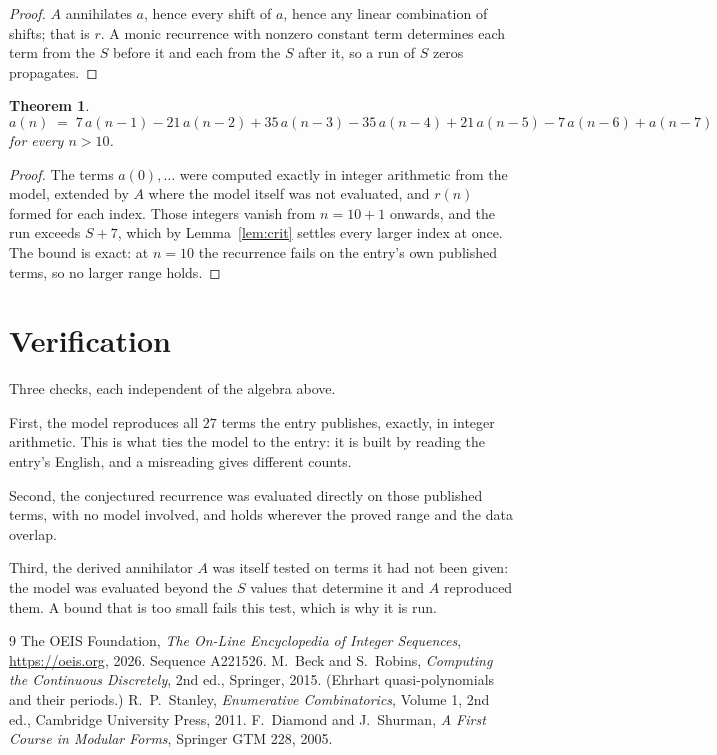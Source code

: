 \documentclass[11pt,a4paper]{article}
\theoremstyle{plain}
\newtheorem{theorem}{Theorem}
\theoremstyle{definition}
\begin{document}
\begin{proof}
$A$ annihilates $a$, hence every shift of $a$, hence any linear combination of shifts; that is
$r$. A monic recurrence with nonzero constant term determines each term from the $S$ before it
and each from the $S$ after it, so a run of $S$ zeros propagates.
\end{proof}

\begin{theorem}
\[
a(n)\;=\;7\,a(n-1) - 21\,a(n-2) + 35\,a(n-3) - 35\,a(n-4) + 21\,a(n-5) - 7\,a(n-6) + a(n-7)
\]
for every $n>10$.
\end{theorem}

\begin{proof}
The terms $a(0),\dots$ were computed exactly in integer arithmetic from the model, extended by
$A$ where the model itself was not evaluated, and $r(n)$ formed for each index. Those integers
vanish from $n=10+1$ onwards, and the run exceeds $S+7$, which by
Lemma~\ref{lem:crit} settles every larger index at once. The bound is exact: at $n=10$ the recurrence fails on the entry's own published terms, so no larger range holds.
\end{proof}

\section{Verification}

Three checks, each independent of the algebra above.

First, the model reproduces all $27$ terms the entry publishes, exactly, in integer
arithmetic. This is what ties the model to the entry: it is built by reading the entry's
English, and a misreading gives different counts.

Second, the conjectured recurrence was evaluated directly on those published terms, with no
model involved, and holds wherever the proved range and the data overlap.

Third, the derived annihilator $A$ was itself tested on terms it had not been given: the model
was evaluated beyond the $S$ values that determine it and $A$ reproduced them. A bound that is
too small fails this test, which is why it is run.

\begin{thebibliography}{9}
 The OEIS Foundation, \emph{The On-Line Encyclopedia of Integer
Sequences}, \url{https://oeis.org}, 2026. Sequence A221526.
 M.~Beck and S.~Robins, \emph{Computing the Continuous Discretely},
2nd ed., Springer, 2015. (Ehrhart quasi-polynomials and their periods.)
 R.~P.~Stanley, \emph{Enumerative Combinatorics}, Volume 1, 2nd ed.,
Cambridge University Press, 2011.
 F.~Diamond and J.~Shurman, \emph{A First Course in Modular Forms},
Springer GTM 228, 2005.
\end{thebibliography}
\end{document}
